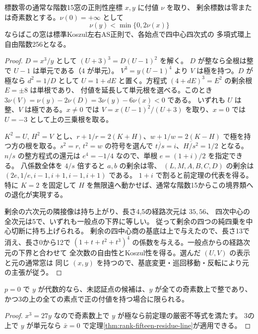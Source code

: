\begin{theorem}\label{thm:rank-fifteen-pole-cone}
標数零の通常な階数15窓の正則性座標 $x,y$ に付値 $\nu$ を取り、
剰余標数は零または奇素数とする。$\nu(0)=+\infty$ として
\[
                 \nu(y)<\min\{0,2\nu(x)\}
\]
ならばこの窓は標準Koszul左右AS正則で、各始点で四中心四次式の
多項式環上自由階数256となる。
\end{theorem}
\begin{proof}
$D=x^3/y$ として $(U+3)^3=D(U-1)^2$ を解く。
$D$ が整なら全根は整で $U-1$ は単元である（$4$ が単元）。
$V^3=y(U-1)^4$ より $V$ は極を持つ。$D$ が極なら $d^2=1/D$ として
$U=1+dE$ と置く。方程式 $(4+dE)^3=E^2$ の剰余根 $E=\pm8$ は単根であり、
付値を延長して単元根を選べる。このとき
$3\nu(V)=\nu(y)-2\nu(D)=3\nu(y)-6\nu(x)<0$ である。
いずれも $U$ は整、$V$ は極である。$x\ne0$ では
$V=x(U-1)^2/(U+3)$ を取り、$x=0$ では $U=-3$ として上の三乗根を取る。

$K^2=U$, $H^2=V$ とし、$r+1/r=2(K+H)$、$w+1/w=2(K-H)$
で極を持つ方の根を取る。$s^2=r$, $t^2=w$ の符号を選んで
$\overline{t/s}=i$、$\overline{H/s^2}=1/2$ となる。
$n/s$ の整方程式の還元は $e^4=-1/4$ なので、単根 $e=(1+i)/2$ を指定できる。
八係数全体を $4/s$ 倍すると $a,b$ の剰余は零、
$(L,M,A,B,C,D)$ の剰余は
$(2e,1/e,i-1,i+1,i-1,i+1)$ である。
$1+i$ で割ると前定理の代表を得る。特に $K=2$ を固定して
$H$ を無限遠へ動かせば、通常な階数15からこの境界類への退化が実現する。

剰余の六次元の隣接像は持ち上がり、長さ4,5の経路次元は $35,56$、
四次中心の全次元は5で、いずれも一般点の下界に等しい。
従って剰余の四つの純四乗を中心切断に持ち上げられる。
剰余の四中心商の基底は上で与えたので、長さ13で消え、長さ0から12で
$(1+t+t^2+t^3)^4$ の係数を与える。一般点からの経路次元の下界と合わせて
全次数の自由性とKoszul性を得る。選んだ $(U,V)$ の表示と元の通常窓は
同じ $(x,y)$ を持つので、基底変更・巡回移動・反転により元の主張が従う。
\end{proof}

\begin{corollary}
$p=0$ で $y$ が代数的なら、未認証点の候補は、$y$ が全ての奇素数上で整であり、
かつ3の上の全ての素点で正の付値を持つ場合に限られる。
\end{corollary}
\begin{proof}
$x^3=27y$ なので奇素数上で $y$ が極なら前定理の厳密不等式を満たす。
3の上で $y$ が単元なら $\bar x=0$ で定理\ref{thm:rank-fifteen-residue-line}が適用できる。
\end{proof}

